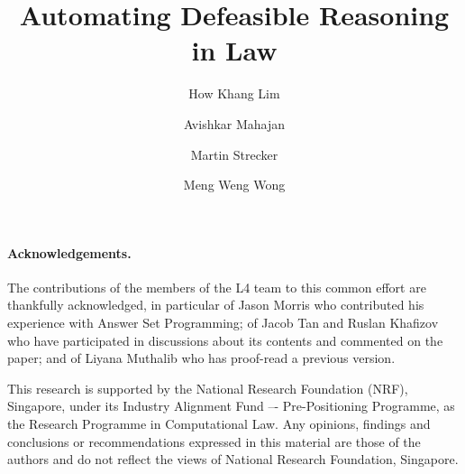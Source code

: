 \documentclass[runningheads]{llncs}
\begin{document}
\title{Automating Defeasible Reasoning in Law}

\author{How Khang Lim \and
  Avishkar Mahajan \and
  Martin Strecker \and
  Meng Weng Wong
  }
\maketitle

\begin{abstract}

\end{abstract}















\paragraph{Acknowledgements.}
The contributions of the members of the L4 team to this common effort are
thankfully acknowledged, in particular of Jason Morris who contributed his
experience with Answer Set Programming; of Jacob Tan and Ruslan Khafizov who
have participated in discussions about its contents and commented on the
paper; and of Liyana Muthalib who has proof-read a previous version.

This research is supported by the National Research Foundation (NRF),
Singapore, under its Industry Alignment Fund –- Pre-Positioning Programme, as
the Research Programme in Computational Law. Any opinions, findings and
conclusions or recommendations expressed in this material are those of the
authors and do not reflect the views of National Research Foundation,
Singapore.






\newpage
\appendix




\end{document}
